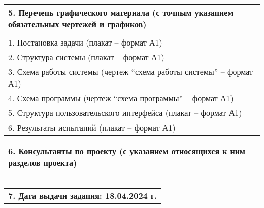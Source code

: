 \documentclass[12pt, А4, twoside]{article} %
\begin{document}
\begin{flushleft}
		
		\begin{tabular}{p{17.25cm}} 
			\textsf{\textbf{5. Перечень графического материала (с точным указанием обязательных чертежей и графиков)}} \vspace{2pt}\\ \hline 
			 \vspace{1pt}\\ \hline 
			\textsf{1. Постановка задачи (плакат – формат А1)} \vspace{2pt}\\ \hline 
			\textsf{2. Структура системы (плакат – формат А1)} \vspace{2pt}\\ \hline 
			\textsf{3. Схема работы системы (чертеж “схема работы системы” – формат А1)} \vspace{2pt}\\ \hline 
			\textsf{4. Схема программы (чертеж “схема программы” – формат А1)} \vspace{2pt}\\ \hline 
			\textsf{5. Структура пользовательского интерфейса (плакат – формат А1)} \vspace{2pt}\\ \hline 
			\textsf{6.  Результаты испытаний (плакат – формат А1)} \vspace{2pt}\\ \hline 
		\end{tabular} 
		
		\begin{tabular}{p{17.25cm}} 
			\vspace{1pt} \\ \hline 
			\textsf{\textbf{6. Консультанты по проекту (с указанием относящихся к ним разделов проекта)}} \vspace{1pt} \\ \hline 
			\vspace{1pt} \\ \hline 
			\vspace{1pt} \\ \hline  
			\vspace{1pt} \\ \hline 
		\end{tabular}   
		
		\begin{tabular}{p{17.25cm}} 
			\vspace{1pt} \\ \hline  
			\textsf{\textbf{7. Дата выдачи задания: 18.04.2024 г.}} \vspace{1pt} \\ \hline 
		\end{tabular} 
		

\end{flushleft}
\end{document}

